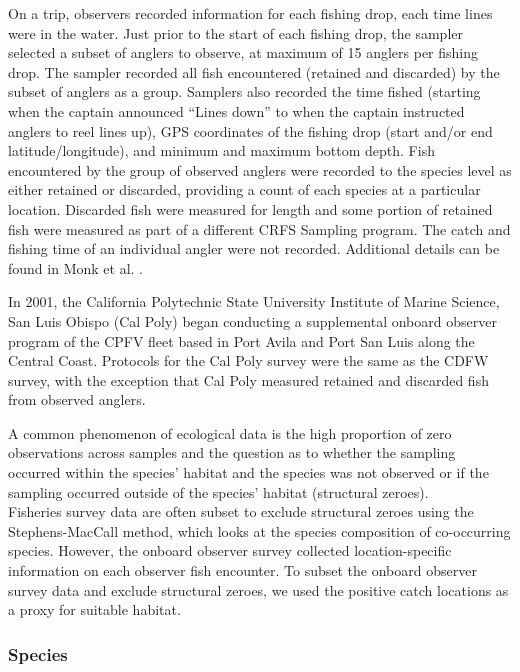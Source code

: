 \documentclass[preprint, 3p,
authoryear]{elsarticle} %
\begin{document}
On a trip, observers recorded information for each fishing drop, each
time lines were in the water. Just prior to the start of each fishing
drop, the sampler selected a subset of anglers to observe, at maximum of
15 anglers per fishing drop. The sampler recorded all fish encountered
(retained and discarded) by the subset of anglers as a group. Samplers
also recorded the time fished (starting when the captain announced
``Lines down'' to when the captain instructed anglers to reel lines up),
GPS coordinates of the fishing drop (start and/or end
latitude/longitude), and minimum and maximum bottom depth. Fish
encountered by the group of observed anglers were recorded to the
species level as either retained or discarded, providing a count of each
species at a particular location. Discarded fish were measured for
length and some portion of retained fish were measured as part of a
different CRFS Sampling program. The catch and fishing time of an
individual angler were not recorded. Additional details can be found in
Monk et al. \citeyearpar{Monk2014}.

In 2001, the California Polytechnic State University Institute of Marine
Science, San Luis Obispo (Cal Poly) began conducting a supplemental
onboard observer program of the CPFV fleet based in Port Avila and Port
San Luis along the Central Coast. Protocols for the Cal Poly survey were
the same as the CDFW survey, with the exception that Cal Poly measured
retained and discarded fish from observed anglers.

A common phenomenon of ecological data is the high proportion of zero
observations across samples and the question as to whether the sampling
occurred within the species' habitat and the species was not observed or
if the sampling occurred outside of the species' habitat (structural
zeroes).\\
Fisheries survey data are often subset to exclude structural zeroes
using the Stephens-MacCall method, which looks at the species
composition of co-occurring species. However, the onboard observer
survey collected location-specific information on each observer fish
encounter. To subset the onboard observer survey data and exclude
structural zeroes, we used the positive catch locations as a proxy for
suitable habitat.

\hypertarget{species}{%
\subsubsection{Species}\label{species}}
\end{document}
